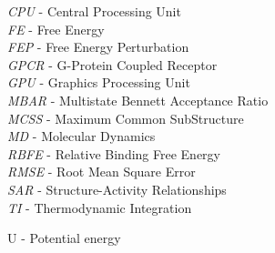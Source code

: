\documentclass[9pt,bestpractices]{livecoms}
\begin{document}
\begin{tcolorbox}[title=Acronyms, colback=blue!10!white]
    \textit{CPU} - Central Processing Unit\\
    \textit{FE} - Free Energy\\
    \textit{FEP} - Free Energy Perturbation\\
    \textit{GPCR} - G-Protein Coupled Receptor\\
    \textit{GPU} - Graphics Processing Unit\\
    \textit{MBAR} - Multistate Bennett Acceptance Ratio\\
    \textit{MCSS} - Maximum Common SubStructure\\
    \textit{MD} - Molecular Dynamics\\
    \textit{RBFE} - Relative Binding Free Energy\\
    \textit{RMSE} - Root Mean Square Error\\
    \textit{SAR} - Structure-Activity Relationships\\
    \textit{TI} - Thermodynamic Integration
\end{tcolorbox}
\begin{tcolorbox}[title=List of Symbols, colback=green!10!white]
U - Potential energy
\end{tcolorbox}
\end{document}
